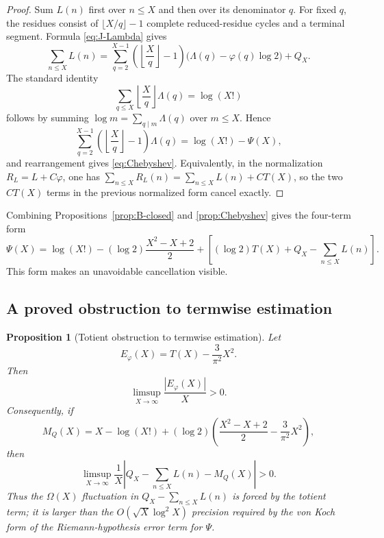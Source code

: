 \documentclass[11pt]{amsart}
\numberwithin{equation}{section}
\newtheorem{proposition}[theorem]{Proposition}
\theoremstyle{definition}
\theoremstyle{remark}
\begin{document}
\begin{proof}
Sum \(L(n)\) first over \(n\leq X\) and then over its denominator \(q\).
For fixed \(q\), the residues consist of
\(\lfloor X/q\rfloor-1\) complete reduced-residue cycles and a terminal
segment.  Formula \eqref{eq:J-Lambda} gives
\[
 \sum_{n\leq X}L(n)
 =\sum_{q=2}^{X-1}
 \left(\left\lfloor\frac Xq\right\rfloor-1\right)
 \bigl(\Lambda(q)-\varphi(q)\log2\bigr)+Q_X.
\]
The standard identity
\[
 \sum_{q\leq X}\left\lfloor\frac Xq\right\rfloor\Lambda(q)
 =\log(X!)
\]
follows by summing \(\log m=\sum_{q\mid m}\Lambda(q)\) over
\(m\leq X\).  Hence
\[
 \sum_{q=2}^{X-1}
 \left(\left\lfloor\frac Xq\right\rfloor-1\right)\Lambda(q)
 =\log(X!)-\Psi(X),
\]
and rearrangement gives \eqref{eq:Chebyshev}.  Equivalently, in the
normalization \(R_L=L+C\varphi\), one has
\(\sum_{n\leq X}R_L(n)=\sum_{n\leq X}L(n)+CT(X)\), so the two
\(CT(X)\) terms in the previous normalized form cancel exactly.
\end{proof}

Combining Propositions~\ref{prop:B-closed} and \ref{prop:Chebyshev} gives
the four-term form
\begin{equation}\label{eq:Chebyshev-four-term}
 \Psi(X)=\log(X!)-(\log2)\frac{X^2-X+2}{2}
 +\left[(\log2)T(X)+Q_X-\sum_{n\leq X}L(n)\right].
\end{equation}
This form makes an unavoidable cancellation visible.

\subsection{A proved obstruction to termwise estimation}

\begin{proposition}[Totient obstruction to termwise estimation]
\label{prop:totient-obstruction}
Let
\begin{equation}\label{eq:Ephi}
 E_\varphi(X)=T(X)-\frac3{\pi^2}X^2.
\end{equation}
Then
\begin{equation}\label{eq:Ephi-Omega}
 \limsup_{X\to\infty}\frac{|E_\varphi(X)|}{X}>0.
\end{equation}
Consequently, if
\begin{equation}\label{eq:MQ}
 M_Q(X)=X-\log(X!)+(\log2)
 \left(\frac{X^2-X+2}{2}-\frac3{\pi^2}X^2\right),
\end{equation}
then
\begin{equation}\label{eq:QminusL-Omega}
 \limsup_{X\to\infty}\frac1X
 \left|Q_X-\sum_{n\leq X}L(n)-M_Q(X)\right|>0.
\end{equation}
Thus the \(\Omega(X)\) fluctuation in
\(Q_X-\sum_{n\leq X}L(n)\) is forced by the totient term; it is larger
than the \(O(\sqrt X\log^2X)\) precision required by the von Koch form of
the Riemann-hypothesis error term for \(\Psi\).
\end{proposition}
\end{document}
